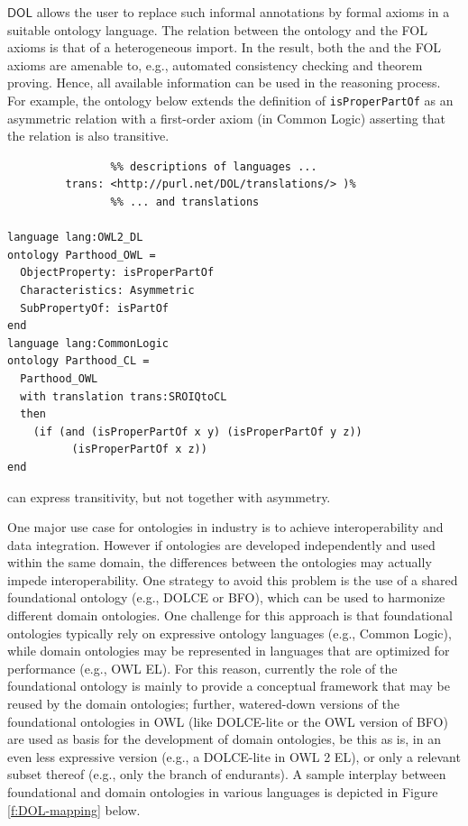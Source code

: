 \documentclass[10pt, a4paper]{isov2}
\newcommand*{\DOL}{\ensuremath{\mathsf{DOL}}\xspace}
\begin{document}
\DOL allows the user to replace such informal annotations by formal axioms in a suitable ontology 
language. The relation between the \OWL ontology and the FOL axioms is that of a heterogeneous 
import. In the result, both the \OWL and the FOL axioms are amenable to, e.g., automated consistency 
checking and theorem proving. Hence, all available information can be used in the reasoning process.
For example, the ontology below extends the \OWL definition of \texttt{isProperPartOf} as an asymmetric relation
with a first-order axiom (in Common Logic) asserting that the relation is also transitive.
\begin{lstlisting}[basicstyle=\small\ttfamily,language=dolText,alsolanguage=clif,alsolanguage=owl2Manchester,escapechar=@,mathescape]
%prefix( lang:  <http://purl.net/DOL/languages/>
                %% descriptions of languages ...
         trans: <http://purl.net/DOL/translations/> )%
                %% ... and translations

language lang:OWL2_DL
ontology Parthood_OWL =
  ObjectProperty: isProperPartOf  
  Characteristics: Asymmetric  
  SubPropertyOf: isPartOf
end
language lang:CommonLogic
ontology Parthood_CL =
  Parthood_OWL
  with translation trans:SROIQtoCL
  then 
    (if (and (isProperPartOf x y) (isProperPartOf y z)) 
          (isProperPartOf x z))
end
\end{lstlisting}
\OWL can express transitivity, but not together with asymmetry.



\label{onto-2}
One major use case for ontologies in industry is to achieve interoperability and data integration. 
However if ontologies are developed independently and used  within the same domain, the 
differences between the ontologies may actually impede interoperability. One strategy to avoid this 
problem is the use of a shared  foundational ontology (e.g., DOLCE or BFO), which can be used to 
harmonize different domain ontologies. One challenge for this approach is that foundational 
ontologies typically rely on expressive ontology languages (e.g., Common Logic), while domain 
ontologies may be represented in languages that are optimized for performance (e.g., OWL EL). For 
this reason, currently the role of the foundational ontology is mainly to provide a conceptual 
framework that may be reused by the  domain ontologies; further, watered-down versions of the 
foundational ontologies in OWL (like DOLCE-lite or the OWL version of BFO) are used as basis for 
the  development of domain ontologies, be this as is, in an even less expressive version (e.g., a 
DOLCE-lite in OWL 2 EL), or only a relevant subset thereof (e.g., only the branch of endurants). A 
sample interplay between  foundational and domain ontologies in various 
languages is depicted in Figure \ref{f:DOL-mapping} below.
\end{document}
